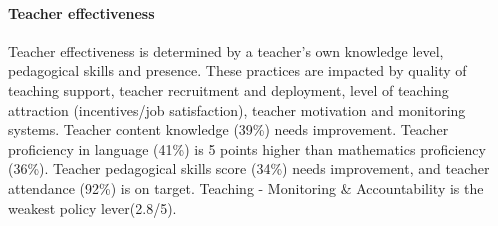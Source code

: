 \documentclass[
  twocolumn]{article}
\begin{document}
\hypertarget{teacher-effectiveness}{%
\paragraph{\texorpdfstring{\textbf{Teacher
effectiveness}}{Teacher effectiveness}}\label{teacher-effectiveness}}

Teacher effectiveness is determined by a teacher's own knowledge level,
pedagogical skills and presence. These practices are impacted by quality
of teaching support, teacher recruitment and deployment, level of
teaching attraction (incentives/job satisfaction), teacher motivation
and monitoring systems. Teacher content knowledge (39\%) needs
improvement. Teacher proficiency in language (41\%) is 5 points higher
than mathematics proficiency (36\%). Teacher pedagogical skills score
(34\%) needs improvement, and teacher attendance (92\%) is on target.
Teaching - Monitoring \& Accountability is the weakest policy
lever(2.8/5).
\end{document}
